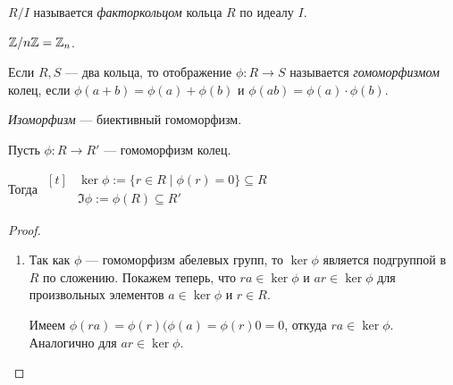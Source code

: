 \begin{comment}
    $R/I$ --- кольцо.
\end{comment}


\begin{definition}
    $R/I$ называется \textit{факторкольцом} кольца $R$ по идеалу $I$.
\end{definition}

\begin{example}
    $\mathbb{Z} / n \mathbb{Z} = \mathbb{Z}_n$.
\end{example}

\begin{definition}
    Если $R, S$ --- два кольца, то отображение $\phi \colon R \to S$ называется \textit{гомоморфизмом} колец, если $\phi(a + b) = \phi(a) + \phi(b)$ и $\phi(ab) = \phi(a) \cdot \phi(b)$.
\end{definition}

\textit{Изоморфизм} --- биективный гомоморфизм.

\bigskip
Пусть $\phi \colon R \to R'$ --- гомоморфизм колец.

Тогда 
\begin{math}
    \begin{aligned}[t]
        &\ker \phi := \{r \in R \mid \phi (r) = 0\} \subseteq R \\
        &\Im \phi := \phi(R) \subseteq R'
    \end{aligned}
\end{math}

\begin{comment}~
    \begin{enumerate}[nosep]
    \item $\ker \phi \lhd R$;
    \item $\Im \phi$ --- подкольцо в $R'$.
    \end{enumerate}
\end{comment}

\begin{proof}~
    \begin{enumerate}
    \item 
        Так как $\phi$ --- гомоморфизм абелевых групп, то $\ker \phi$ является подгруппой в $R$ по сложению. Покажем теперь, что $ra \in \ker \phi$ и $ar \in \ker \phi$ для произвольных элементов $a \in \ker \phi$ и $r \in R$.

        Имеем $\phi(ra) = \phi(r)(\phi(a) = \phi(r) 0 = 0$, откуда $ra \in \ker \phi$. Аналогично для $ar \in \ker \phi$.
    \end{enumerate}
\end{proof}

